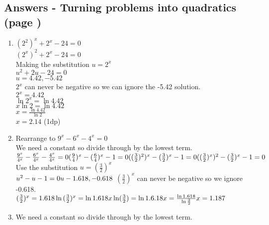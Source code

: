 \documentclass[../main.tex]{subfiles}
\begin{document}
\subsection*{Answers - Turning problems into quadratics (page \pageref{quadratics})}
\label{Quadratics answers}
\begin{spacing}{1.5}
\begin{enumerate}
    \item
    \((2^2)^x+2^x-24=0\)\\
    \((2^x)^2+2^x-24=0\)\\
    Making the substitution \(u=2^x\)\\
    \(u^2+2u-24=0\)\\
    \(u=4.42, -5.42\)\\
    \(2^x\) can never be negative so we can ignore the -5.42 solution.\\
    \(2^x=4.42\)\\
    \(\ln{2^x}=\ln{4.42}\)\\
    \(x\ln{2}=\ln{4.42}\)\\
    \(x=\frac{\ln{4.42}}{\ln{2}}\)\\
    \(x=2.14\) (1dp)
    \item 
    Rearrange to \(9^x-6^x-4^x=0\)\\
    We need a constant so divide through by the lowest term.\\
    \(
    \frac{9^x}{4^x}-\frac{6^x}{4^x}-\frac{4^x}{4^x}=0\\
    (\frac{9}{4})^x-(\frac{6}{4})^x-1=0\\
    ((\frac{3}{2})^2)^x-(\frac{3}{2})^x-1=0\\
    ((\frac{3}{2})^x)^2-(\frac{3}{2})^x-1=0\\ 
    \)
    Use the substitution \(u=(\frac{3}{2})^x\)\\
    \(
    u^2-u-1=0\\
    u-1.618, -0.618\\
    \)
    \((\frac{3}{2})^x\) can never be negative so we ignore -0.618.\\
    \(
    (\frac{3}{2})^x=1.618\\
    \ln{(\frac{3}{2})^x}=\ln{1.618}\\
    x\ln(\frac{3}{2})=\ln{1.6.18}\\
    x=\frac{\ln{1.618}}{\ln{\frac{3}{2}}}\\
    x=1.187
    \)
    \item 
    We need a constant so divide through by the lowest term.\\

\end{enumerate}
\end{spacing}
\end{document}
